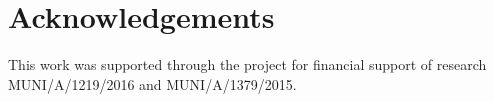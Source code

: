 \documentclass[final,5p,times]{elsarticle}
\begin{document}
\section{Acknowledgements}
\label{ackno}
This work was supported through the project for financial support of research MUNI/A/1219/2016 and MUNI/A/1379/2015.















\end{document}
